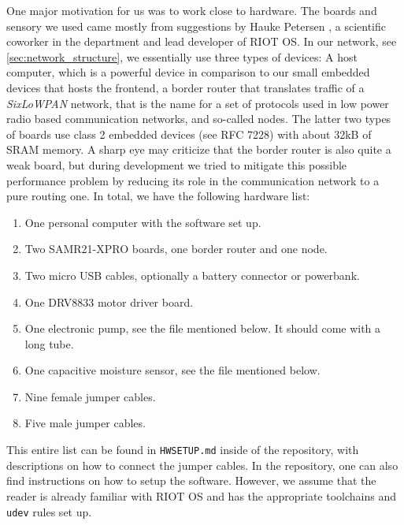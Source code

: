 \documentclass[acmtog, language=english, nonacm]{acmart}
\begin{document}
    One major motivation for us was to work close to hardware. The boards and sensory we used came mostly from suggestions by Hauke Petersen \cite{hauke-petersen-fu-page}, a scientific coworker in the department and lead developer of RIOT OS. In our network, see \cref{sec:network_structure}, we essentially use three types of devices: A host computer, which is a powerful device in comparison to our small embedded devices that hosts the frontend, a border router that translates traffic of a \emph{SixLoWPAN} network, that is the name for a set of protocols used in low power radio based communication networks, and so-called nodes. The latter two types of boards use class 2 embedded devices (see RFC 7228) with about 32kB of SRAM memory. A sharp eye may criticize that the border router is also quite a weak board, but during development we tried to mitigate this possible performance problem by reducing its role in the communication network to a pure routing one. In total, we have the following hardware list:
    \begin{enumerate}
        \item One personal computer with the software set up.
        \item Two SAMR21-XPRO boards, one border router and one node.
        \item Two micro USB cables, optionally a battery connector or powerbank.
        \item One DRV8833 motor driver board.
        \item One electronic pump, see the file mentioned below. It should come with a long tube.
        \item One capacitive moisture sensor, see the file mentioned below.
        \item Nine female jumper cables.
        \item Five male jumper cables.
    \end{enumerate}
    This entire list can be found in \texttt{HWSETUP.md} inside of the repository, with descriptions on how to connect the jumper cables. In the repository, one can also find instructions on how to setup the software. However, we assume that the reader is already familiar with RIOT OS and has the appropriate toolchains and \texttt{udev} rules set up.
\end{document}
